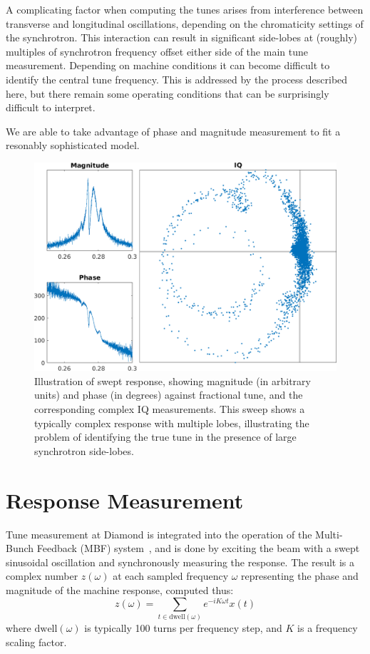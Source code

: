 \documentclass[
    a4paper,
    keeplastbox,            %
    hyphens,                %
    nospread,               %
    refpage,                %
]{jacow}
\newcommand{\squarecaption}[2][1]{\caption[#1]{#2\unskip\parfillskip 0pt}}
\begin{document}
A complicating factor when computing the tunes arises from interference between
transverse and longitudinal oscillations, depending on the chromaticity settings
of the synchrotron.  This interaction can result in significant side-lobes at
(roughly) multiples of synchrotron frequency offset either side of the main tune
measurement.  Depending on machine conditions it can become difficult to
identify the central tune frequency.  This is addressed by the process described
here, but there remain some operating conditions that can be surprisingly
difficult to interpret.

We are able to take advantage of phase and magnitude measurement to fit a
resonably sophisticated model.


\begin{figure}[ht]
\includegraphics[width=\linewidth]{WECO03f1.png}
\squarecaption{%
Illustration of swept response, showing magnitude (in arbitrary units) and phase
(in degrees) against fractional tune, and the corresponding complex IQ
measurements.  This sweep shows a typically complex response with multiple
lobes, illustrating the problem of identifying the true tune in the presence of
large synchrotron side-lobes.
}
\label{fig:response}
\end{figure}


\section{Response Measurement}

Tune measurement at Diamond is integrated into the operation of the Multi-Bunch
Feedback (MBF) system~\cite{icalepcs2017}, and is done by exciting the beam with
a swept sinusoidal oscillation and synchronously measuring the response.  The
result is a complex number $z(\omega)$ at each sampled frequency $\omega$
representing the phase and magnitude of the machine response, computed thus:
\[
    z(\omega) = \sum_{t\in\text{dwell}(\omega)} e^{-iK\omega t} x(t)
\]
where $\text{dwell}(\omega)$ is typically 100 turns per frequency step, and $K$
is a frequency scaling factor.
\end{document}

